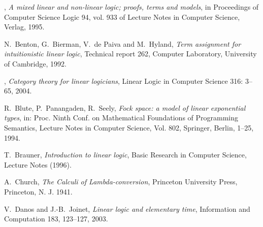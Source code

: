 \documentclass[english,letter paper,12pt,reqno]{article}
\theoremstyle{example}
\begin{document}
\begin{thebibliography}{BHLS03}
\bysame, \textsl{A mixed linear and non-linear logic; proofs, terms and models}, in Proceedings of Computer Science Logic 94, vol. 933 of Lecture Notes in Computer Science, Verlag, 1995.

N.~Benton, G.~Bierman, V.~de Paiva and M.~Hyland, \textsl{Term assignment for intuitionistic linear logic}, Technical report 262, Computer Laboratory, University of Cambridge, 1992.




\bysame, \textsl{Category theory for linear logicians}, Linear Logic in Computer Science 316: 3--65, 2004.

R.~Blute, P.~Panangaden, R.~Seely, \textsl{Fock space: a model of linear exponential types}, in: Proc. Ninth Conf. on Mathematical Foundations of Programming Semantics, Lecture Notes in Computer Science, Vol. 802, Springer, Berlin, 1--25, 1994.

T.~Brauner, \textsl{Introduction to linear logic}, Basic Research in Computer Science, Lecture Notes (1996).

A.~Church, \textsl{The {C}alculi of {L}ambda-conversion}, Princeton University Press, Princeton, N. J. 1941.

V.~Danos and J.-B.~Joinet, \textsl{Linear logic and elementary time}, Information and Computation 183, 123--127, 2003.





\end{thebibliography}
\end{document}
